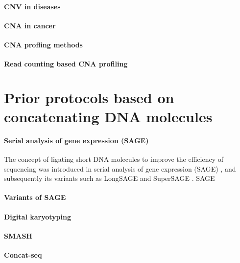 



\paragraph{CNV in diseases}

\paragraph{CNA in cancer}




\paragraph{CNA profling methods}


\paragraph{Read counting based CNA profiling}



\section{Prior protocols based on concatenating DNA molecules}
\paragraph{Serial analysis of gene expression (SAGE)}
The concept of ligating short DNA molecules to improve the efficiency
of sequencing was introduced in serial analysis of gene expression
(SAGE) \citep{}, and subsequently its variants such as LongSAGE and
SuperSAGE \citep{}. SAGE

\paragraph{Variants of SAGE}

\paragraph{Digital karyotyping}

\paragraph{SMASH}

\paragraph{Concat-seq}

